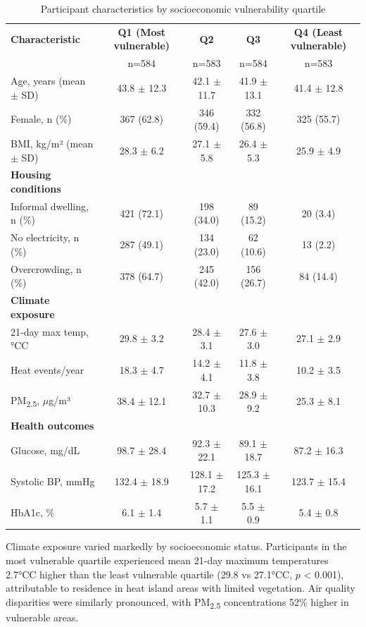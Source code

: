 \documentclass[11pt,a4paper]{article}
\newcommand{\degrees}{°C}
\begin{document}
\begin{table}[h!]
\centering
\caption{Participant characteristics by socioeconomic vulnerability quartile}
\begin{tabular}{lcccc}
\toprule
\textbf{Characteristic} & \textbf{Q1 (Most vulnerable)} & \textbf{Q2} & \textbf{Q3} & \textbf{Q4 (Least vulnerable)} \\
& n=584 & n=583 & n=584 & n=583 \\
\midrule
Age, years (mean $\pm$ SD) & 43.8 $\pm$ 12.3 & 42.1 $\pm$ 11.7 & 41.9 $\pm$ 13.1 & 41.4 $\pm$ 12.8 \\
Female, n (\%) & 367 (62.8) & 346 (59.4) & 332 (56.8) & 325 (55.7) \\
BMI, kg/m² (mean $\pm$ SD) & 28.3 $\pm$ 6.2 & 27.1 $\pm$ 5.8 & 26.4 $\pm$ 5.3 & 25.9 $\pm$ 4.9 \\
\midrule
\textbf{Housing conditions} & & & & \\
Informal dwelling, n (\%) & 421 (72.1) & 198 (34.0) & 89 (15.2) & 20 (3.4) \\
No electricity, n (\%) & 287 (49.1) & 134 (23.0) & 62 (10.6) & 13 (2.2) \\
Overcrowding, n (\%) & 378 (64.7) & 245 (42.0) & 156 (26.7) & 84 (14.4) \\
\midrule
\textbf{Climate exposure} & & & & \\
21-day max temp, \degrees C & 29.8 $\pm$ 3.2 & 28.4 $\pm$ 3.1 & 27.6 $\pm$ 3.0 & 27.1 $\pm$ 2.9 \\
Heat events/year & 18.3 $\pm$ 4.7 & 14.2 $\pm$ 4.1 & 11.8 $\pm$ 3.8 & 10.2 $\pm$ 3.5 \\
PM\textsubscript{2.5}, $\mu$g/m³ & 38.4 $\pm$ 12.1 & 32.7 $\pm$ 10.3 & 28.9 $\pm$ 9.2 & 25.3 $\pm$ 8.1 \\
\midrule
\textbf{Health outcomes} & & & & \\
Glucose, mg/dL & 98.7 $\pm$ 28.4 & 92.3 $\pm$ 22.1 & 89.1 $\pm$ 18.7 & 87.2 $\pm$ 16.3 \\
Systolic BP, mmHg & 132.4 $\pm$ 18.9 & 128.1 $\pm$ 17.2 & 125.3 $\pm$ 16.1 & 123.7 $\pm$ 15.4 \\
HbA1c, \% & 6.1 $\pm$ 1.4 & 5.7 $\pm$ 1.1 & 5.5 $\pm$ 0.9 & 5.4 $\pm$ 0.8 \\
\bottomrule
\end{tabular}
\end{table}

Climate exposure varied markedly by socioeconomic status. Participants in the most vulnerable quartile experienced mean 21-day maximum temperatures 2.7\degrees C higher than the least vulnerable quartile (29.8 vs 27.1\degrees C, $p$ < 0.001), attributable to residence in heat island areas with limited vegetation. Air quality disparities were similarly pronounced, with PM\textsubscript{2.5} concentrations 52\% higher in vulnerable areas.
\end{document}
